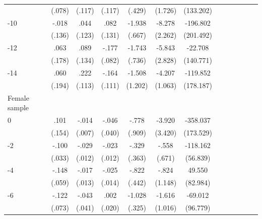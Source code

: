 \begin{table}[p]
\begin{adjustbox}{max width=\linewidth}
\begin{threeparttable}
{\begin{tabular}{l*{6}{SS}}
                &   (.078)         &   (.117)         &   (.117)         &   (.429)         &  (1.726)         &(133.202)         \\
-10            &    -.018         &     .044         &     .082         &   -1.938\sym{***}&   -8.278\sym{***}& -196.802         \\
                &   (.136)         &   (.123)         &   (.131)         &   (.667)         &  (2.262)         &(201.492)         \\
-12           &     .063         &     .089         &    -.177\sym{**} &   -1.743\sym{**} &   -5.843\sym{**} &  -22.708         \\
                &   (.178)         &   (.134)         &   (.082)         &   (.736)         &  (2.828)         &(140.771)         \\
-14           &     .060         &     .222\sym{**} &    -.164         &   -1.508         &   -4.207\sym{***}& -119.852         \\
                &   (.194)         &   (.113)         &   (.111)         &  (1.202)         &  (1.063)         &(178.187)         \\
\midrule
Female sample &&&&&&\\
0               &     .101         &    -.014\sym{**} &    -.046         &    -.778         &   -3.920         & -358.037\sym{**} \\
                &   (.154)         &   (.007)         &   (.040)         &   (.909)         &  (3.420)         &(173.529)         \\
-2             &    -.100\sym{***}&    -.029\sym{**} &    -.023\sym{*}  &    -.329         &    -.558         & -118.162\sym{**} \\
                &   (.033)         &   (.012)         &   (.012)         &   (.363)         &   (.671)         & (56.839)         \\
-4             &    -.148\sym{**} &    -.017         &    -.025\sym{*}  &    -.822\sym{*}  &    -.824         &   49.550         \\
                &   (.059)         &   (.013)         &   (.014)         &   (.442)         &  (1.148)         & (82.984)         \\
-6             &    -.122\sym{*}  &    -.043         &     .002         &   -1.028\sym{***}&   -1.616         &  -69.012         \\
                &   (.073)         &   (.041)         &   (.020)         &   (.325)         &  (1.016)         & (96.779)         \\

\end{tabular}}
\end{threeparttable}
\end{adjustbox}
\end{table}
